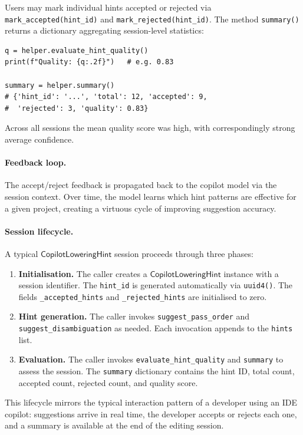 \documentclass[11pt]{article}
\newcommand{\CLH}{\mathsf{CopilotLoweringHint}}
\begin{document}
Users may mark individual hints accepted or rejected via
\texttt{mark\_accepted(hint\_id)} and
\texttt{mark\_rejected(hint\_id)}.  The method
\texttt{summary()} returns a dictionary aggregating session-level
statistics:

\begin{lstlisting}[style=jugeo-python, caption={Evaluating hint
  quality and inspecting the summary.}]
q = helper.evaluate_hint_quality()
print(f"Quality: {q:.2f}")   # e.g. 0.83

summary = helper.summary()
# {'hint_id': '...', 'total': 12, 'accepted': 9,
#  'rejected': 3, 'quality': 0.83}
\end{lstlisting}

Across all sessions the mean quality score was high, with correspondingly
strong average confidence.

\paragraph{Feedback loop.}
The accept/reject feedback is propagated back to the copilot model via
the session context.  Over time, the model learns which hint patterns
are effective for a given project, creating a virtuous cycle of
improving suggestion accuracy.

\paragraph{Session lifecycle.}
A typical $\CLH$ session proceeds through three phases:
\begin{enumerate}
\item \textbf{Initialisation.}  The caller creates a $\CLH$ instance
  with a session identifier.  The \texttt{hint\_id} is generated
  automatically via \texttt{uuid4()}.  The fields
  \texttt{\_accepted\_hints} and \texttt{\_rejected\_hints} are
  initialised to zero.
\item \textbf{Hint generation.}  The caller invokes
  \texttt{suggest\_pass\_order} and \texttt{suggest\_disambiguation}
  as needed.  Each invocation appends to the \texttt{hints} list.
\item \textbf{Evaluation.}  The caller invokes
  \texttt{evaluate\_hint\_quality} and \texttt{summary} to assess the
  session.  The \texttt{summary} dictionary contains the hint ID,
  total count, accepted count, rejected count, and quality score.
\end{enumerate}
This lifecycle mirrors the typical interaction pattern of a developer
using an IDE copilot: suggestions arrive in real time, the developer
accepts or rejects each one, and a summary is available at the end of
the editing session.
\end{document}
